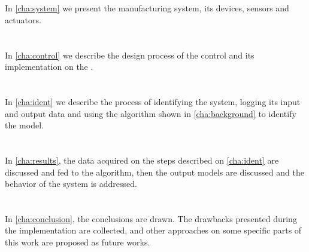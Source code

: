 \paragraph{} ~\\
In \autoref{cha:system} we present the manufacturing system, its devices, sensors and actuators. 

\paragraph{} ~\\
In \autoref{cha:control} we describe the design process of the control and its
implementation on the \PLCs.

\paragraph{} ~\\
In \autoref{cha:ident} we describe the process of identifying the system,
logging its input and output data and
using the algorithm shown in
\autoref{cha:background} to identify the model.

\paragraph{} ~\\
In \autoref{cha:results}, the data acquired on the steps described on
\autoref{cha:ident} are discussed and fed to the algorithm, then the
output models are discussed and the behavior of the system is addressed.


\paragraph{} ~\\
In \autoref{cha:conclusion}, the conclusions are drawn. The drawbacks presented during the implementation are
collected, and other approaches on some specific parts of this work are proposed
as future works.


